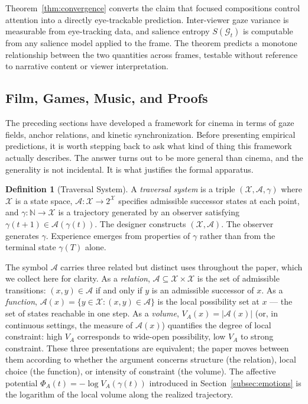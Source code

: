 \documentclass[12pt, a4paper]{article}
\theoremstyle{plain}
\theoremstyle{definition}
\newtheorem{definition}[theorem]{Definition}
\theoremstyle{remark}
\newcommand{\X}{\mathcal{X}}
\newcommand{\A}{\mathcal{A}}
\newcommand{\G}{\mathcal{G}}
\newcommand{\traj}{\gamma}
\begin{document}
Theorem~\ref{thm:convergence} converts the claim that
focused compositions control attention into a directly
eye-trackable prediction. Inter-viewer gaze variance is
measurable from eye-tracking data, and salience entropy
$S(\G_t)$ is computable from any salience model applied
to the frame. The theorem predicts a monotone relationship
between the two quantities across frames, testable without
reference to narrative content or viewer interpretation.
\label{sec:unified}

\subsection{Film, Games, Music, and Proofs}
\label{subsec:unified_cases}

The preceding sections have developed a framework for cinema
in terms of gaze fields, anchor relations, and kinetic
synchronization. Before presenting empirical predictions, it
is worth stepping back to ask what kind of thing this
framework actually describes. The answer turns out to be more
general than cinema, and the generality is not incidental. It
is what justifies the formal apparatus.

\begin{definition}[Traversal System]
  A \emph{traversal system} is a triple $(\X, \A, \traj)$
  where $\X$ is a state space, $\A : \X \to 2^{\X}$
  specifies admissible successor states at each point, and
  $\traj : \mathbb{N} \to \X$ is a trajectory generated by
  an observer satisfying $\traj(t+1) \in \A(\traj(t))$.
  The designer constructs $(\X, \A)$. The observer generates
  $\traj$. Experience emerges from properties of $\traj$
  rather than from the terminal state $\traj(T)$ alone.
\end{definition}

The symbol $\A$ carries three related but distinct uses
throughout the paper, which we collect here for clarity.
As a \emph{relation}, $\A \subseteq \X \times \X$ is the
set of admissible transitions: $(x, y) \in \A$ if and only
if $y$ is an admissible successor of $x$. As a
\emph{function}, $\A(x) = \{y \in \X : (x,y) \in \A\}$ is
the local possibility set at $x$ --- the set of states
reachable in one step. As a \emph{volume}, $V_A(x) =
|\A(x)|$ (or, in continuous settings, the measure of
$\A(x)$) quantifies the degree of local constraint: high
$V_A$ corresponds to wide-open possibility, low $V_A$ to
strong constraint. These three presentations are equivalent;
the paper moves between them according to whether the
argument concerns structure (the relation), local choice
(the function), or intensity of constraint (the volume).
The affective potential $\Phi_A(t) = -\log V_A(\traj(t))$
introduced in Section~\ref{subsec:emotions} is the
logarithm of the local volume along the realized trajectory.
\end{document}
